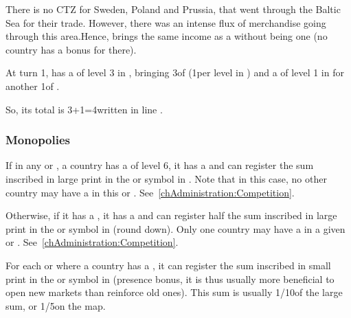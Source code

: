\begin{designnote}
  There is no CTZ for Sweden, Poland and Prussia, that went through the
  Baltic Sea for their trade. However, there was an intense flux of
  merchandise going through this area.Hence,  brings the
  same income as a \CTZ without being one (no country has a bonus for
  \TFI there).
\end{designnote}


\begin{exemple}
  At turn 1, \POR has a \TradeFLEET of level 3 in ,
  bringing 3\ducats of  (1\ducats per level in \STZ)
  and a \TradeFLEET of level 1 in  for another 1\ducats of
  .

  So, its total  is 3+1=4\ducats written in
  line .
\end{exemple}

\subsubsection{Monopolies}\label{chIncomes:Commercial Monopoly}
\aparag If in any \CTZ or \STZ, a country has a \TradeFLEET of level 6,
it has a  and can register the sum inscribed in
large print in the \CTZ or \STZ symbol in .
\bparag Note that in this case, no other country may have a \TradeFLEET
in this \CTZ or \STZ. See~\ref{chAdministration:Competition}.

\aparag Otherwise, if it has a \TradeFLEET\faceplus, it has a
 and can register half the sum inscribed in
large print in the \CTZ or \STZ symbol in  (round down).
\bparag Only one country may have a \TradeFLEET\faceplus in a given \CTZ
or \STZ. See~\ref{chAdministration:Competition}.

\aparag For each \CTZ or \STZ where a country has a
\TradeFLEET\facemoins, it can register the sum inscribed in small print
in the \CTZ or \STZ symbol in 
(presence bonus, it is thus usually more beneficial to open new
markets than reinforce old ones).
\bparag This sum is usually 1/10\th of the large sum, or 1/5\th on the
\ROTW map.


